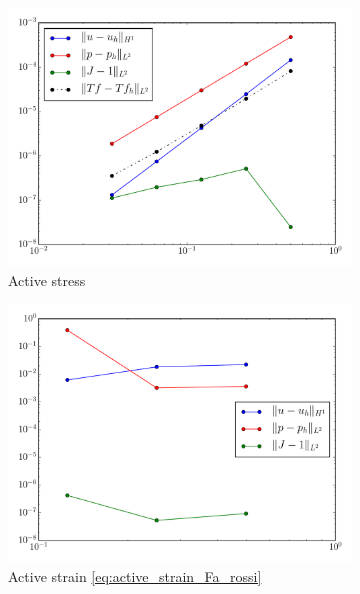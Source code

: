 \documentclass[a4paper,10pt]{article}
\begin{document}
\begin{figure}[htbp]
\centering
\begin{subfigure}[t]{0.3\textwidth}
     \centering
     \includegraphics[width=\textwidth]{figures/mms2d_active_stress_qinc}
     \caption{\label{fig:mms2d_active_stress_qinc}Active stress}
\end{subfigure}
\begin{subfigure}[t]{0.3\textwidth}
    \includegraphics[width=\textwidth]{figures/mms2d_active_strain_rossi_qinc}
    \caption{\label{fig:mms2d_active_stain_rossi_qinc}Active strain \eqref{eq:active_strain_Fa_rossi} }    
\end{subfigure}
\begin{subfigure}[t]{0.3\textwidth}

\end{subfigure}
\end{figure}
\end{document}
